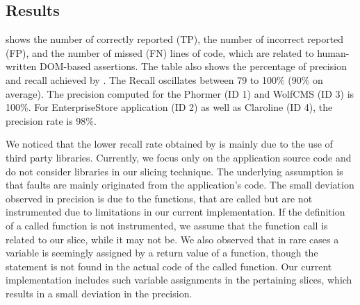 \subsection{Results} \label{Sec:results}
 shows the number of  correctly reported (TP), the number of incorrect reported (FP), and the number of missed (FN) \javascript lines of code, which are related to human-written DOM-based assertions. The table also shows the percentage of precision and recall achieved by \tool. The Recall oscillates between 79 to 100\% (90\% on average). The precision computed for the Phormer (ID 1) and WolfCMS (ID 3) is 100\%. For EnterpriseStore application (ID 2) as well as Claroline (ID 4), the precision rate is 98\%.

We noticed that the lower recall rate obtained by \tool is mainly due to the use of third party libraries. Currently, we focus only on the application source code and do not consider libraries in our slicing technique. The underlying assumption is that faults are mainly originated from the application's code. The small deviation observed in precision is due to the functions, that are called but are not instrumented due to limitations in our current implementation. If the definition of a called function is not instrumented, we assume that the function call is related to our slice, while it may not be. We also observed that in rare cases a variable is seemingly assigned by a return value of a function, though the  statement is not found in the actual code of the called function. Our current implementation includes such variable assignments in the pertaining slices, which results in a small deviation in the precision.  

